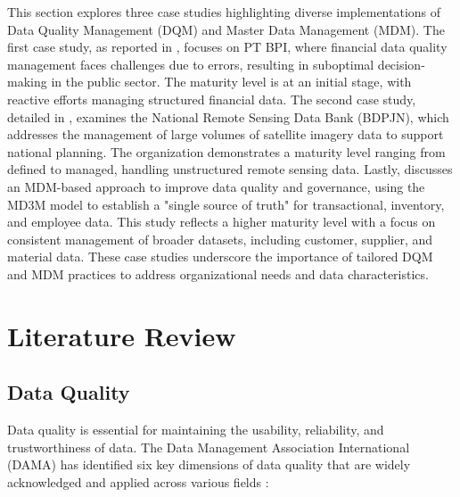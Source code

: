 \documentclass[conference]{IEEEtran}
\begin{document}

This section explores three case studies highlighting diverse implementations of Data Quality Management (DQM) and Master Data Management (MDM). The first case study, as reported in \cite{dqmBPI2022}, focuses on PT BPI, where financial data quality management faces challenges due to errors, resulting in suboptimal decision-making in the public sector. The maturity level is at an initial stage, with reactive efforts managing structured financial data. The second case study, detailed in \cite{payani2023}, examines the National Remote Sensing Data Bank (BDPJN), which addresses the management of large volumes of satellite imagery data to support national planning. The organization demonstrates a maturity level ranging from defined to managed, handling unstructured remote sensing data. Lastly, \cite{hikmawati2021} discusses an MDM-based approach to improve data quality and governance, using the MD3M model to establish a "single source of truth" for transactional, inventory, and employee data. This study reflects a higher maturity level with a focus on consistent management of broader datasets, including customer, supplier, and material data. These case studies underscore the importance of tailored DQM and MDM practices to address organizational needs and data characteristics.


\section{Literature Review}

\subsection{Data Quality}

Data quality is essential for maintaining the usability, reliability, and trustworthiness of data. The Data Management Association International (DAMA) has identified six key dimensions of data quality that are widely acknowledged \cite{DAMA_2013} and applied across various fields \cite{wahyudi2023data, kiran2024addressing, antonio2024data}:  
\end{document}
